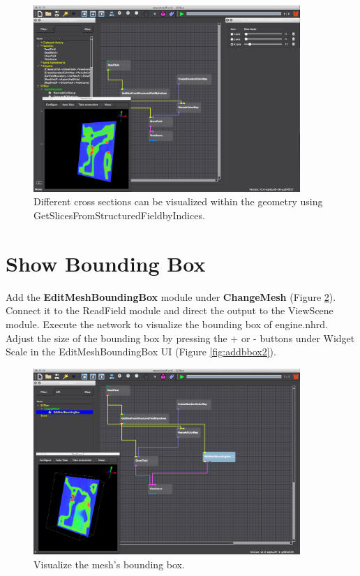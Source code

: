 \documentclass[fleqn,11pt,openany]{book}
\begin{document}
\begin{figure}[H]
\center
\includegraphics[width=0.9\textwidth]{BasicTutorial_figures/sliceselect.png}
\caption{Different cross sections can be visualized within the geometry using GetSlicesFromStructuredFieldbyIndices. }
\label{fig:getslice}
\end{figure}


\section{Show Bounding Box}\label{bbox}

Add the \textbf{EditMeshBoundingBox} module under \textbf{ChangeMesh} (Figure \ref{fig:addbbox}). Connect it to the ReadField module and direct the output to the ViewScene module. Execute the network to visualize the bounding box of engine.nhrd. Adjust the size of the bounding box by pressing the + or - buttons under Widget Scale in the EditMeshBoundingBox UI (Figure \ref{fig:addbbox2}).

\begin{figure}[H]
\center
\includegraphics[width=0.9\textwidth]{BasicTutorial_figures/editmeshboundingbox.png}
\caption{Visualize the mesh's bounding box.}
\label{fig:addbbox}
\end{figure}
\end{document}
